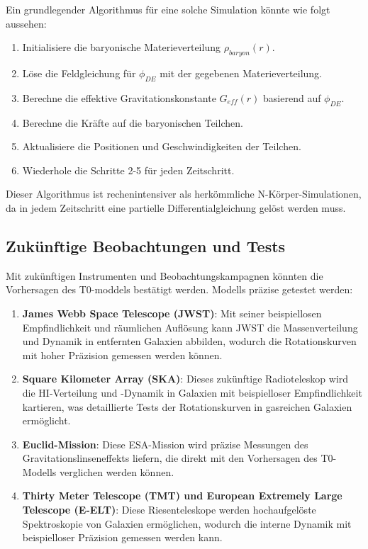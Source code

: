 \documentclass[a4paper,12pt]{article}
\begin{document}
	Ein grundlegender Algorithmus für eine solche Simulation könnte wie folgt aussehen:
	
	\begin{enumerate}
		\item Initialisiere die baryonische Materieverteilung $\rho_{baryon}(r)$.
		\item Löse die Feldgleichung für $\phi_{DE}$ mit der gegebenen Materieverteilung.
		\item Berechne die effektive Gravitationskonstante $G_{eff}(r)$ basierend auf $\phi_{DE}$.
		\item Berechne die Kräfte auf die baryonischen Teilchen.
		\item Aktualisiere die Positionen und Geschwindigkeiten der Teilchen.
		\item Wiederhole die Schritte 2-5 für jeden Zeitschritt.
	\end{enumerate}
	
	Dieser Algorithmus ist rechenintensiver als herkömmliche N-Körper-Simulationen, da in jedem Zeitschritt eine partielle Differentialgleichung gelöst werden muss.
	
	\subsection{Zukünftige Beobachtungen und Tests}
	
	Mit zukünftigen Instrumenten und Beobachtungskampagnen könnten die Vorhersagen des T0-moddels bestätigt werden.
	Modells präzise getestet werden:
	
	\begin{enumerate}
		\item \textbf{James Webb Space Telescope (JWST)}: Mit seiner beispiellosen Empfindlichkeit und räumlichen Auflösung kann JWST die Massenverteilung und Dynamik in entfernten Galaxien abbilden, wodurch die Rotationskurven mit hoher Präzision gemessen werden können.
		
		\item \textbf{Square Kilometer Array (SKA)}: Dieses zukünftige Radioteleskop wird die HI-Verteilung und -Dynamik in Galaxien mit beispielloser Empfindlichkeit kartieren, was detaillierte Tests der Rotationskurven in gasreichen Galaxien ermöglicht.
		
		\item \textbf{Euclid-Mission}: Diese ESA-Mission wird präzise Messungen des Gravitationslinseneffekts liefern, die direkt mit den Vorhersagen des T0-Modells verglichen werden können.
		
		\item \textbf{Thirty Meter Telescope (TMT) und European Extremely Large Telescope (E-ELT)}: Diese Riesenteleskope werden hochaufgelöste Spektroskopie von Galaxien ermöglichen, wodurch die interne Dynamik mit beispielloser Präzision gemessen werden kann.
	\end{enumerate}
	
\end{document}
